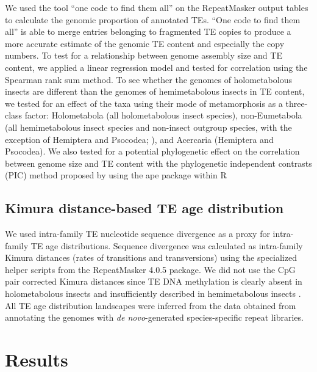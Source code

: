 We used the tool ``one code to find them all'' \citep{Bailly-Bechet2014}
on the RepeatMasker output tables to calculate the genomic proportion of
annotated TEs. ``One code to find them all'' is able to merge entries
belonging to fragmented TE copies to produce a more accurate estimate of
the genomic TE content and especially the copy numbers. To test for a
relationship between genome assembly size and TE content, we applied a
linear regression model and tested for correlation using the Spearman
rank sum method. To see whether the genomes of holometabolous insects
are different than the genomes of hemimetabolous insects in TE content,
we tested for an effect of the taxa using their mode of metamorphosis as
a three-class factor: Holometabola (all holometabolous insect species),
non-Eumetabola (all hemimetabolous insect species and non-insect
outgroup species, with the exception of Hemiptera and Psocodea;
\citet{Beutel_2013}), and Acercaria (Hemiptera and Psocodea). We also
tested for a potential phylogenetic effect on the correlation between
genome size and TE content with the phylogenetic independent contrasts
(PIC) method proposed by \citet{Felsenstein1985} using the ape package
\citep{Paradis2004} within R \citep{RCoreTeam2017}





\subsection{Kimura distance-based TE age
distribution}\label{kimura-distance-based-te-age-distribution}

We used intra-family TE nucleotide sequence divergence as a proxy for
intra-family TE age distributions. Sequence divergence was calculated as
intra-family Kimura distances (rates of transitions and transversions)
using the specialized helper scripts from the RepeatMasker 4.0.5
package. We did not use the CpG pair corrected Kimura distances since TE
DNA methylation is clearly absent in holometabolous insects and
insufficiently described in hemimetabolous insects \citep{Glastad2014}.
All TE age distribution landscapes were inferred from the data obtained
from annotating the genomes with \emph{de novo}-generated
species-specific repeat libraries.

\section{Results}\label{results}

